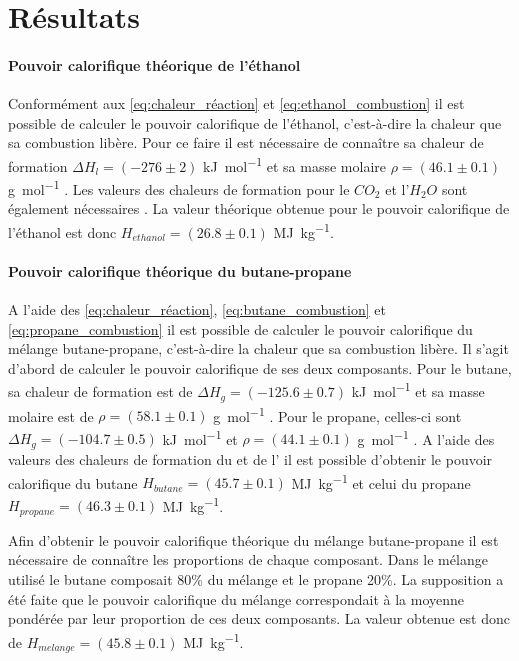 \section{Résultats}

\paragraph*{Pouvoir calorifique théorique de l'éthanol}
Conformément aux \autoref{eq:chaleur_réaction} et \autoref{eq:ethanol_combustion} il est possible de calculer le pouvoir calorifique de l'éthanol, c'est-à-dire la chaleur que sa combustion libère. Pour ce faire il est nécessaire de connaître sa chaleur de formation \(\Delta H_{l} = (-276 \pm 2)\) \si{\kilo\joule\per\mol} et sa masse molaire \(\rho = (46.1 \pm 0.1)\) \si{\gram\per\mol} \cite{ethanol-values}. Les valeurs des chaleurs de formation pour le \(CO_2\) et l'\(H_2O\) sont également nécessaires \cite{notice}. La valeur théorique obtenue pour le pouvoir calorifique de l'éthanol est donc \(H_{ethanol} = (26.8 \pm 0.1)\) \si{\mega\joule\per\kilo\gram}.







\paragraph*{Pouvoir calorifique théorique du butane-propane}
A l'aide des \autoref{eq:chaleur_réaction}, \autoref{eq:butane_combustion} et \autoref{eq:propane_combustion} il est possible de calculer le pouvoir calorifique du mélange butane-propane, c'est-à-dire la chaleur que sa combustion libère. Il s'agit d'abord de calculer le pouvoir calorifique de ses deux composants. Pour le butane, sa chaleur de formation est de \(\Delta H_{g} = (-125.6 \pm 0.7)\) \si{\kilo\joule\per\mol} et sa masse molaire est de \(\rho = (58.1 \pm 0.1)\) \si{\gram\per\mol} \cite{butane-values}. Pour le propane, celles-ci sont \(\Delta H_{g} = (-104.7 \pm 0.5)\) \si{\kilo\joule\per\mol} et \(\rho = (44.1 \pm 0.1)\) \si{\gram\per\mol} \cite{propane-values}. A l'aide des valeurs des chaleurs de formation du  et de l' \cite{notice} il est possible d'obtenir le pouvoir calorifique du butane \(H_{butane} = (45.7 \pm 0.1)\) \si{\mega\joule\per\kilo\gram} et celui du propane \(H_{propane} = (46.3 \pm 0.1)\) \si{\mega\joule\per\kilo\gram}.

Afin d'obtenir le pouvoir calorifique théorique du mélange butane-propane il est nécessaire de connaître les proportions de chaque composant. Dans le mélange utilisé le butane composait 80\% du mélange et le propane 20\%. La supposition a été faite que le pouvoir calorifique du mélange correspondait à la moyenne pondérée par leur proportion de ces deux composants. La valeur obtenue est donc de \(H_{melange} = (45.8 \pm 0.1)\) \si{\mega\joule\per\kilo\gram}.





